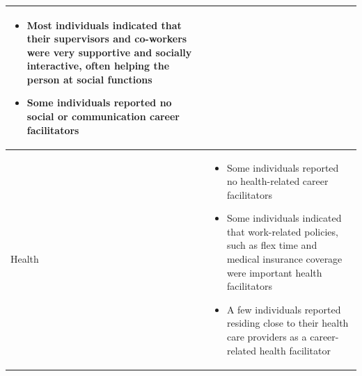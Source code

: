 \documentclass[11.5pt]{sig-alternate} %
\begin{document}
\begin{large}
\begin{table}[th]
\begin{tabular}{|l|l|}
\begin{itemize}[noitemsep, topsep=0pt, leftmargin=*]
\item Most individuals indicated that their supervisors and co-workers were very supportive and socially interactive, often helping the person at social functions
\item Some individuals reported no social or communication career facilitators
\end{itemize} \\ \hline
Health &
\begin{itemize}[noitemsep, topsep=0pt, leftmargin=*]
\item Some individuals reported no health-related career facilitators
\item Some individuals indicated that work-related policies, such as flex time and medical insurance coverage were important health facilitators
\item A few individuals reported residing close to their health care providers as a career-related health facilitator
\end{itemize} \\ \hline
\end{tabular}
\end{table}


\end{large}
\end{document}
